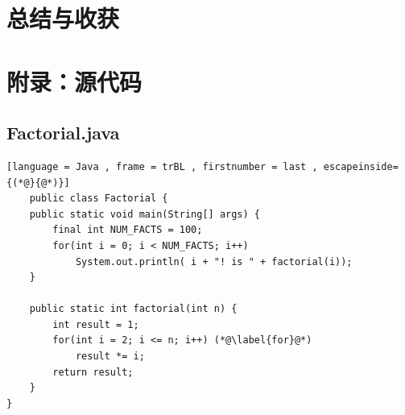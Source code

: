 \documentclass[UTF8]{ctexart}
\begin{document}
\section{总结与收获}
\newpage
\appendix
\section{附录：源代码}
\subsection{Factorial.java}
\begin{lstlisting}[language = Java , frame = trBL , firstnumber = last , escapeinside={(*@}{@*)}]
    public class Factorial {
    public static void main(String[] args) {   
        final int NUM_FACTS = 100;
        for(int i = 0; i < NUM_FACTS; i++)
            System.out.println( i + "! is " + factorial(i));
    }

    public static int factorial(int n) {
        int result = 1;
        for(int i = 2; i <= n; i++) (*@\label{for}@*)
            result *= i;
        return result;
    }
}
\end{lstlisting}
\end{document}
